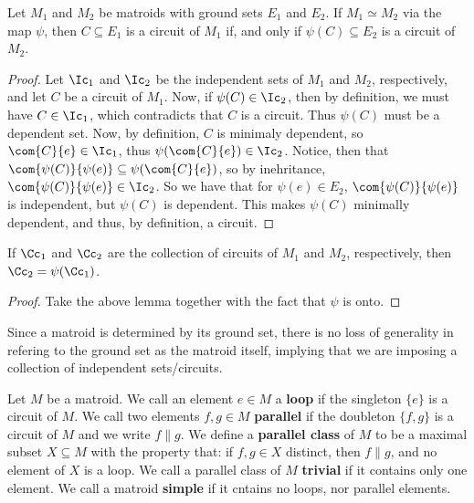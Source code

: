 \begin{lemma}\label{1.1.3}
    Let $M_1$ and $M_2$ be matroids with ground sets $E_1$ and $E_2$. If $M_1
    \simeq M_2$ via the map $\psi$, then $C \subseteq E_1$ is a circuit of $M_1$
    if, and only if $\psi(C) \subseteq E_2$ is a circuit of $M_2$.
\end{lemma}
\begin{proof}
    Let $\Ic_1$ and $\Ic_2$ be the independent sets of $M_1$ and $M_2$,
    respectively, and let $C$ be a circuit of  $M_1$. Now, if $\psi(C) \in
    \Ic_2$, then by definition, we must have $C \in \Ic_1$, which contradicts
    that $C$ is a circuit. Thus  $\psi(C)$ must be a dependent set. Now, by
    definition, $C$ is minimaly dependent, so  $\com{C}{e} \in \Ic_1$, thus
    $\psi(\com{C}{e}) \in \Ic_2$. Notice, then that $\com{\psi(C)}{\psi(e)}
    \subseteq \psi(\com{C}{e})$, so by inehritance, $\com{\psi(C)}{\psi(e)} \in
    \Ic_2$. So we have that for $\psi(e) \in E_2$, $\com{\psi(C)}{\psi(e)}$ is
    independent, but $\psi(C)$ is dependent. This makes $\psi(C)$ minimally
    dependent, and thus, by definition, a circuit.
\end{proof}
\begin{corollary}
    If $\Cc_1$ and $\Cc_2$ are the collection of circuits of $M_1$ and $M_2$,
    respectively, then $\Cc_2=\psi(\Cc_1)$.
\end{corollary}
\begin{proof}
    Take the above lemma together with the fact that $\psi$ is onto.
\end{proof}

Since a matroid is determined by its ground set, there is no loss of generality
in refering to the ground set as the matroid itself, implying that we are
imposing a collection of independent sets/circuits.

\begin{definition}
    Let $M$ be a matroid. We call an element $e \in M$ a  \textbf{loop} if the
    singleton $\{e\}$ is a circuit of $M$. We call two elements  $f,g \in M$
     \textbf{parallel} if the doubleton $\{f,g\}$ is a circuit of $M$ and we
     write  $f\|g$. We define a \textbf{parallel class} of $M$ to be a maximal
     subset  $X \subseteq M$ with the property that: if  $f,g \in X$ distinct,
     then $f\|g$, and no element of  $X$ is a loop. We call a parallel class of
     $M$  \textbf{trivial} if it contains only one element. We call a matroid
     \textbf{simple} if it cntains no loops, nor parallel elements.
\end{definition}
